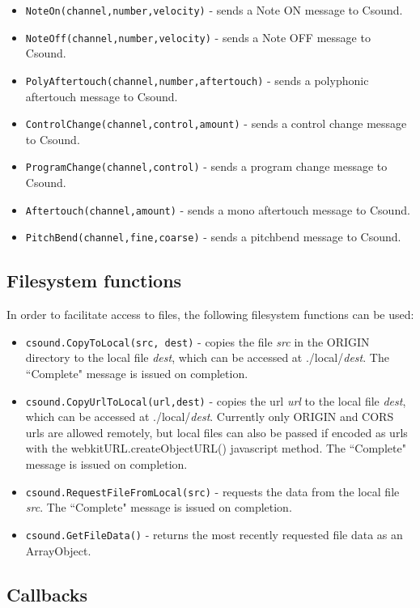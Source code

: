 \documentclass[11pt]{article}
\begin{document}
\begin{itemize}
\item {\tt NoteOn(channel,number,velocity)} - sends a Note ON message to Csound.
\item {\tt NoteOff(channel,number,velocity)} - sends a Note OFF message to Csound.
\item {\tt PolyAftertouch(channel,number,aftertouch)} - sends a polyphonic aftertouch message to Csound.
\item {\tt ControlChange(channel,control,amount)} - sends a control change message to Csound.
\item {\tt ProgramChange(channel,control)} - sends a program change message to Csound.
\item {\tt Aftertouch(channel,amount)} - sends a mono aftertouch message to Csound.
\item {\tt PitchBend(channel,fine,coarse)} - sends a pitchbend message to Csound.
\end{itemize}

\subsection{Filesystem functions}

In order to facilitate access to files, the following filesystem functions can be used:

\begin{itemize}
\item {\tt csound.CopyToLocal(src, dest)} - copies the file \emph{src} in the ORIGIN directory to the local file \emph{dest}, which can
be accessed at ./local/\emph{dest}. The ``Complete" message is issued on completion.
\item {\tt csound.CopyUrlToLocal(url,dest)} - copies the url \emph{url} to the local file \emph{dest}, which can
be accessed at ./local/\emph{dest}. Currently only ORIGIN and CORS urls are allowed remotely, but local files can
also be passed if encoded as urls with the webkitURL.createObjectURL() javascript method. The ``Complete" message is issued on completion.
\item {\tt csound.RequestFileFromLocal(src)} - requests the data from the local file \emph{src}. The ``Complete" message is issued on completion. 
\item {\tt csound.GetFileData()} - returns the most recently requested file data as an ArrayObject.
\end{itemize}


\subsection{Callbacks}
\end{document}
